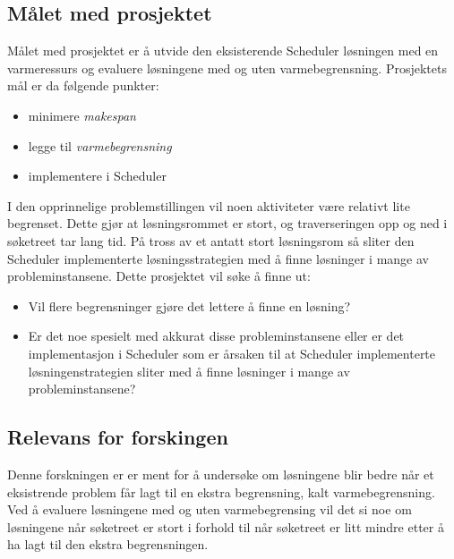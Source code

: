 \subsection{Målet med prosjektet}
Målet med prosjektet er å utvide den eksisterende Scheduler løsningen med en varmeressurs og evaluere løsningene med og uten varmebegrensning. Prosjektets mål er da følgende punkter:
\begin{itemize}
\item minimere \textit{makespan}
\item legge til \textit{varmebegrensning}
\item implementere i Scheduler
\end{itemize}

I den opprinnelige problemstillingen vil noen aktiviteter være relativt lite begrenset. Dette gjør at løsningsrommet er stort, og traverseringen opp og ned i søketreet tar lang tid. På tross av et antatt stort løsningsrom så sliter den Scheduler implementerte løsningsstrategien med å finne løsninger i mange av probleminstansene. Dette prosjektet vil søke å finne ut:

\begin{itemize}
\item Vil flere begrensninger gjøre det lettere å finne en løsning?
\item Er det noe spesielt med akkurat disse probleminstansene eller er det implementasjon i Scheduler som er årsaken til at Scheduler implementerte løsningenstrategien sliter med å finne løsninger i mange av probleminstansene?
\end{itemize}

\subsection{Relevans for forskingen}
Denne forskningen er er ment for å undersøke om løsningene blir bedre når et eksistrende problem får lagt til en ekstra begrensning, kalt varmebegrensning. Ved å evaluere løsningene med og uten varmebegrensing vil det si noe om løsningene når søketreet er stort i forhold til når søketreet er litt mindre etter å ha lagt til den ekstra begrensningen.